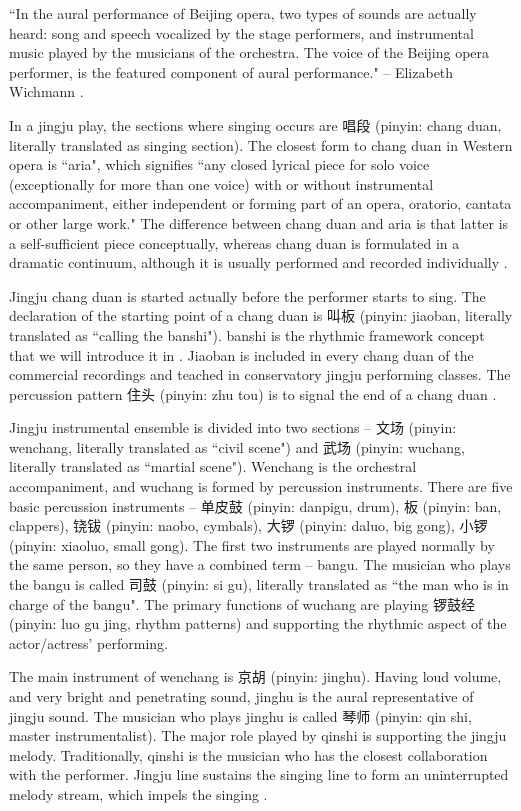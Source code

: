 ``In the aural performance of Beijing opera, two types of sounds are actually heard: song and speech vocalized by the stage performers, and instrumental music played by the musicians of the orchestra. The voice of the Beijing opera performer, is the featured component of aural performance." -- Elizabeth Wichmann \cite{Wichmann1991a}.

In a jingju play, the sections where singing occurs are 唱段 (pinyin: chang duan, literally translated as singing section). The closest form to chang duan in Western opera is ``aria", which signifies ``any closed lyrical piece for solo voice (exceptionally for more than one voice) with or without instrumental accompaniment, either independent or forming part of an opera, oratorio, cantata or other large work." The difference between chang duan and aria is that latter is a self-sufficient piece conceptually, whereas chang duan is formulated in a dramatic continuum, although it is usually performed and recorded individually \cite{Repetto2018}. 

Jingju chang duan is started actually before the performer starts to sing. The declaration of the starting point of a chang duan is 叫板 (pinyin: jiaoban, literally translated as ``calling the banshi"). \Gls{banshi} is the rhythmic framework concept that we will introduce it in . Jiaoban is included in every chang duan of the commercial recordings and teached in conservatory jingju performing classes. The percussion pattern 住头 (pinyin: zhu tou) is to signal the end of a chang duan \cite{Mu2007a}.

Jingju instrumental ensemble is divided into two sections -- 文场 (pinyin: wenchang, literally translated as ``civil scene") and 武场 (pinyin: wuchang, literally translated as ``martial scene"). Wenchang is the orchestral accompaniment, and wuchang is formed by percussion instruments. There are five basic percussion instruments -- 单皮鼓 (pinyin: danpigu, drum), 板 (pinyin: ban, clappers), 铙钹 (pinyin: naobo, cymbals), 大锣 (pinyin: daluo, big gong), 小锣 (pinyin: xiaoluo, small gong). The first two instruments are played normally by the same person, so they have a combined term -- bangu. The musician who plays the bangu is called 司鼓 (pinyin: si gu), literally translated as ``the man who is in charge of the bangu". The primary functions of wuchang are playing 锣鼓经 (pinyin: luo gu jing, rhythm patterns) and supporting the rhythmic aspect of the actor/actress' performing.

The main instrument of wenchang is 京胡 (pinyin: \gls{jinghu}). Having loud volume, and very bright and penetrating sound, \gls{jinghu} is the aural representative of jingju sound. The musician who plays \gls{jinghu} is called 琴师 (pinyin: qin shi, master instrumentalist). The major role played by qinshi is supporting the jingju melody. Traditionally, qinshi is the musician who has the closest collaboration with the performer. Jingju line sustains the singing line to form an uninterrupted melody stream, which impels the singing \cite{Repetto2018}. 

